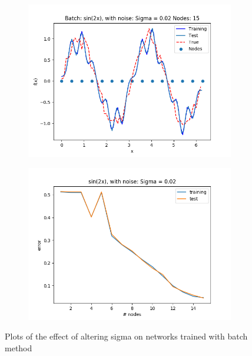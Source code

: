 \documentclass{article}
\begin{document}
\begin{figure}[ht!]
\begin{subfigure}[t]{0.4\textwidth}
        \caption{}
    \end{subfigure}
    \begin{subfigure}[t]{0.4\textwidth}
        \includegraphics[width=1\textwidth]{plots/noise/batch_sin2x_sigma_002}
        \caption{}
    \end{subfigure}
    \begin{subfigure}[t]{0.4\textwidth}
        \centering
        \includegraphics[width=1\textwidth]{plots/noise/batch_sin2x_error_sigma_002}
        \caption{}
    \end{subfigure}
    \caption{Plots of the effect of altering sigma on networks trained with batch method}
\end{figure}
\end{document}
